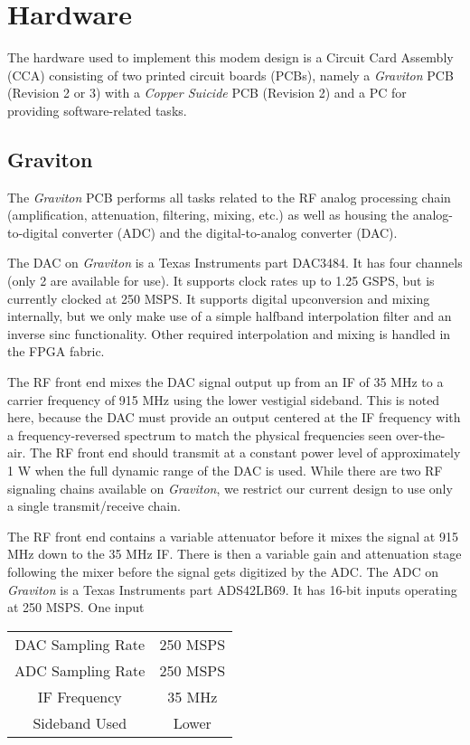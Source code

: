 \documentclass[conference]{IEEEtran}
\begin{document}
\section{Hardware}
\label{sec:hardware}

The hardware used to implement this modem design is a Circuit Card
Assembly (CCA) consisting of two printed circuit boards (PCBs), namely
a \emph{Graviton} PCB (Revision 2 or 3) with a \emph{Copper Suicide} PCB
(Revision 2) and a PC for providing software-related tasks.

\subsection*{Graviton}

The \emph{Graviton} PCB performs all tasks related to the RF analog
processing chain (amplification, attenuation, filtering, mixing, etc.)
as well as housing the analog-to-digital converter (ADC) and the
digital-to-analog converter (DAC).

The DAC on \emph{Graviton} is a Texas Instruments part DAC3484. It has
four channels (only 2 are available for use). It supports clock rates
up to 1.25 GSPS, but is currently clocked at 250 MSPS. It supports
digital upconversion and mixing internally, but we only make use of a
simple halfband interpolation filter and an inverse sinc functionality.
Other required interpolation and mixing is handled in the FPGA fabric.

The RF front end mixes the DAC signal output up from an IF of 35 MHz
to a carrier frequency of 915 MHz using the lower vestigial sideband.
This is noted here, because the DAC must provide an output centered
at the IF frequency with a frequency-reversed spectrum to match the
physical frequencies seen over-the-air. The RF front end should transmit
at a constant power level of approximately 1 W when the full dynamic
range of the DAC is used. While there are two RF signaling chains
available on \emph{Graviton}, we restrict our current design to use
only a single transmit/receive chain.

The RF front end contains a variable attenuator before it mixes the
signal at 915 MHz down to the 35 MHz IF. There is then a variable
gain and attenuation stage following the mixer before the signal
gets digitized by the ADC. The ADC on \emph{Graviton} is a Texas
Instruments part ADS42LB69. It has 16-bit inputs operating at
250 MSPS. One input

\begin{table}
\begin{tabular}{cc}
DAC Sampling Rate & 250 MSPS \\
ADC Sampling Rate & 250 MSPS \\
IF Frequency & 35 MHz \\
Sideband Used & Lower
\end{tabular}
\centering
\end{table}
\end{document}
